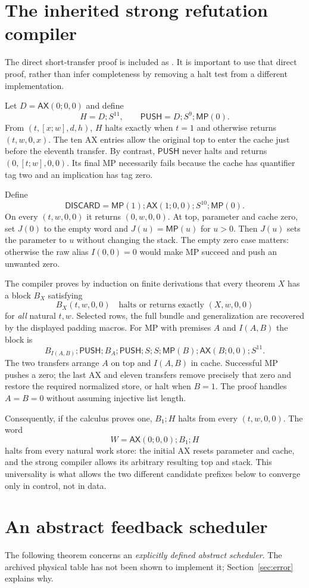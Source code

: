 \documentclass[11pt]{article}
\newcommand{\file}[1]{{\small\path{#1}}}
\newcommand{\MP}{\mathsf{MP}}
\newcommand{\AX}{\mathsf{AX}}
\newcommand{\PUSH}{\mathsf{PUSH}}
\newcommand{\DISCARD}{\mathsf{DISCARD}}
\begin{document}
\section{The inherited strong refutation compiler}
The direct short-transfer proof is included as \file{proofs/short_transfer_compiler.md}. It is important to use that direct proof, rather than infer completeness by removing a halt test from a different implementation.

Let $D=\AX(0;0,0)$ and define
\[
 H=D;S^{11},\qquad \PUSH=D;S^9;\MP(0).
\]
From $(t,[x;w],d,h)$, $H$ halts exactly when $t=1$ and otherwise returns $(t,w,0,x)$. The ten AX entries allow the original top to enter the cache just before the eleventh transfer. By contrast, $\PUSH$ never halts and returns $(0,[t;w],0,0)$. Its final MP necessarily fails because the cache has quantifier tag two and an implication has tag zero.

Define
\[
 \DISCARD=\MP(1);\AX(1;0,0);S^{10};\MP(0).
\]
On every $(t,w,0,0)$ it returns $(0,w,0,0)$. At top, parameter and cache zero, set $J(0)$ to the empty word and $J(u)=\MP(u)$ for $u>0$. Then $J(u)$ sets the parameter to $u$ without changing the stack. The empty zero case matters: otherwise the raw alias $I(0,0)=0$ would make MP succeed and push an unwanted zero.

The compiler proves by induction on finite derivations that every theorem $X$ has a block $B_X$ satisfying
\[
 B_X(t,w,0,0)\quad\text{halts or returns exactly }(X,w,0,0)
\]
for \emph{all} natural $t,w$. Selected rows, the full bundle and generalization are recovered by the displayed padding macros. For MP with premises $A$ and $I(A,B)$ the block is
\[
 B_{I(A,B)};\PUSH;B_A;\PUSH;S;S;
 \MP(B);\AX(B;0,0);S^{11}.
\]
The two transfers arrange $A$ on top and $I(A,B)$ in cache. Successful MP pushes a zero; the last AX and eleven transfers remove precisely that zero and restore the required normalized store, or halt when $B=1$. The proof handles $A=B=0$ without assuming injective list length.

Consequently, if the calculus proves one, $B_1;H$ halts from every $(t,w,0,0)$. The word
\[
 W=\AX(0;0,0);B_1;H
\]
halts from every natural work store: the initial AX resets parameter and cache, and the strong compiler allows its arbitrary resulting top and stack. This universality is what allows the two different candidate prefixes below to converge only in control, not in data.

\section{An abstract feedback scheduler}
The following theorem concerns an \emph{explicitly defined abstract scheduler}. The archived physical table has not been shown to implement it; Section~\ref{sec:error} explains why.
\end{document}
